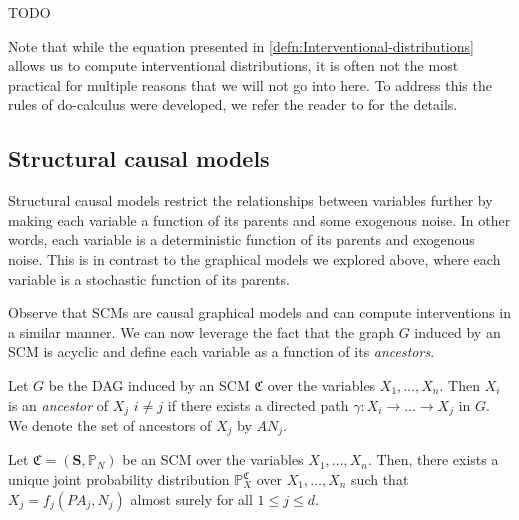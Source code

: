 \documentclass[../main.tex]{subfiles}
\begin{document}
    \begin{ex}
    \label{ex:Graphical-model-interventions-and-Counterfactuals}
        TODO
    \end{ex}
    \begin{rem}
    \label{rem:Computing-interventions-in-practice}
        Note that while the equation presented in \autoref{defn:Interventional-distributions} allows us to compute interventional distributions, it is often not the most practical for multiple reasons that we will not go into here. To address this the rules of do-calculus were developed, we refer the reader to \cite{elements_causal_inf} for the details. 
    \end{rem}
    \subsection{Structural causal models}   
    Structural causal models restrict the relationships between variables further by making each variable a function of its parents and some exogenous noise. In other words, each variable is a deterministic function of its parents and exogenous noise. This is in contrast to the graphical models we explored above, where each variable is a stochastic function of its parents. 
    \begin{defn}
    \label{defn:Structural-causal-models}
        
    \end{defn}
    Observe that SCMs are causal graphical models and can compute interventions in a similar manner. 
    We can now leverage the fact that the graph $G$ induced by an SCM is acyclic and define each variable as a function of its \emph{ancestors}.
    \begin{defn}[Ancestors]\label{defn:SCM-Ancestors}
        Let ${G}$ be the DAG induced by an SCM ${\mathfrak{C}}$ over the variables ${X_1,\dots, X_n}$. Then ${X_i}$ is an \emph{ancestor} of ${X_j}$ ${i\neq j}$ if there exists a directed path ${\gamma: X_i \rightarrow \dots \rightarrow X_j}$ in ${G}$. We denote the set of ancestors of ${X_j}$ by ${AN_j}$.       
    \end{defn}
    \begin{pro}\label{pro:Ancestral sampling and observational distributions}
        Let ${\mathfrak{C} = (\mathbf{S}, \mathbb{P}_N)}$ be an SCM over the variables ${X_1,\dots, X_n}$. Then, there exists a unique joint probability distribution ${\mathbb{P}_X^\mathfrak{C}}$ over ${X_1,\dots , X_n}$ such that ${X_j = f_j(PA_j, N_j)}$ almost surely for all ${1\leq j \leq d}$.   
    \end{pro}
\end{document}
